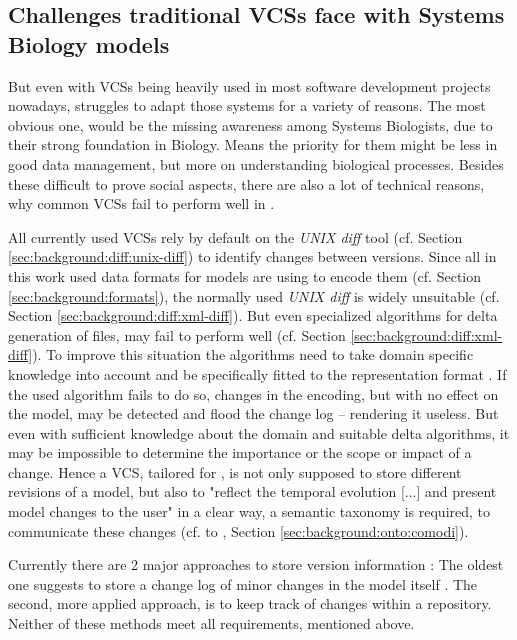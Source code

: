	\subsection{Challenges traditional VCSs face with Systems Biology models}
	\label{sec:background:manage-versions:challenges}
	
	But even with VCSs being heavily used in most software development projects nowadays, \sysbio struggles to adapt those systems for a variety of reasons.
	The most obvious one, would be the missing awareness among Systems Biologists, due to their strong foundation in Biology. Means the priority for them might be less in good data management, but more on understanding biological processes.
	Besides these difficult to prove social aspects, there are also a lot of technical reasons, why common VCSs fail to perform well in \sysbio.
	
	All currently used VCSs rely by default on the \emph{UNIX diff} tool (cf. Section \ref{sec:background:diff:unix-diff}) to identify changes between versions. Since all in this work used data formats for \sysbio models are using \xml to encode them (cf. Section \ref{sec:background:formats}), the normally used \emph{UNIX diff} is widely unsuitable (cf. Section \ref{sec:background:diff:xml-diff}).
	But even specialized algorithms for delta generation of \xml files, may fail to perform well (cf. Section \ref{sec:background:diff:xml-diff}). To improve this situation the algorithms need to take domain specific knowledge into account and be specifically fitted to the representation format \citep{Waltemath2013}.
	If the used algorithm fails to do so, changes in the encoding, but with no effect on the model, may be detected and flood the change log -- rendering it useless.
	But even with sufficient knowledge about the domain and suitable \xml delta algorithms, it may be impossible to determine the importance or the scope or impact of a change. Hence a VCS, tailored for \sysbio, is not only supposed to store different revisions of a model, but also to "reflect the temporal evolution [...] and present model changes to the user" \citep{Waltemath2013} in a clear way, a semantic taxonomy is required, to communicate these changes (cf. to \comodi, Section \ref{sec:background:onto:comodi}).
	
	Currently there are 2 major approaches to store version information \citep{Waltemath2013}: The oldest one suggests to store a change log of minor changes in the model itself \citep{Beard2009}.
	The second, more applied approach, is to keep track of changes within a repository.
	Neither of these methods meet all requirements, mentioned above.
	
